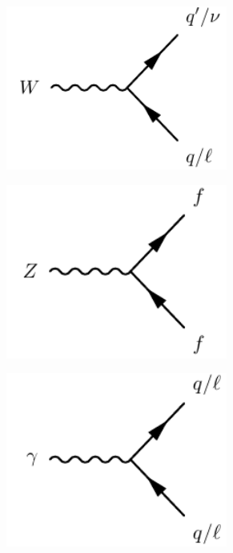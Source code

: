 \begin{figure}
	\centering
	\begin{subfigure}[b]{0.33\linewidth}
		\centering\includegraphics[width=0.8\textwidth]{w_fermion_vertex}
		\caption{\label{fig:w_fermion_vertex}}
	\end{subfigure}%
	\begin{subfigure}[b]{0.33\linewidth}
		\centering\includegraphics[width=0.8\textwidth]{z_fermion_vertex}
		\caption{\label{fig:z_fermion_vertex}}
	\end{subfigure}	
	\begin{subfigure}[b]{0.33\linewidth}
		\centering\includegraphics[width=0.8\textwidth]{gamma_fermion_vertex}

\end{subfigure}
\end{figure}
